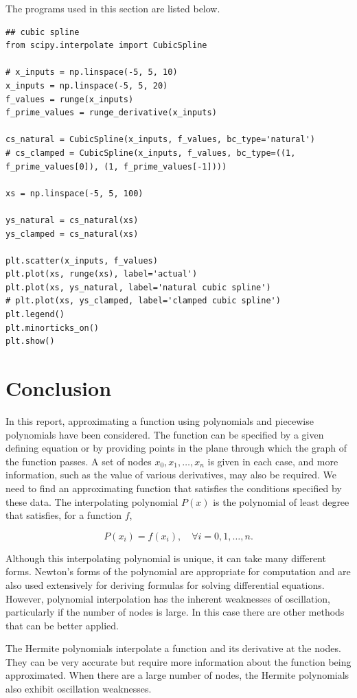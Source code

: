 \documentclass[preprint,12pt]{elsarticle}
\begin{document}
The programs used in this section are listed below.

\begin{lstlisting}
## cubic spline
from scipy.interpolate import CubicSpline

# x_inputs = np.linspace(-5, 5, 10)
x_inputs = np.linspace(-5, 5, 20)
f_values = runge(x_inputs)
f_prime_values = runge_derivative(x_inputs)

cs_natural = CubicSpline(x_inputs, f_values, bc_type='natural')
# cs_clamped = CubicSpline(x_inputs, f_values, bc_type=((1, f_prime_values[0]), (1, f_prime_values[-1])))

xs = np.linspace(-5, 5, 100)

ys_natural = cs_natural(xs)
ys_clamped = cs_natural(xs)

plt.scatter(x_inputs, f_values)
plt.plot(xs, runge(xs), label='actual')
plt.plot(xs, ys_natural, label='natural cubic spline')
# plt.plot(xs, ys_clamped, label='clamped cubic spline')
plt.legend()
plt.minorticks_on()
plt.show()
\end{lstlisting}

\section{Conclusion}
\label{S:5}

In this report, approximating a function using polynomials and piecewise polynomials have been considered. The function can be specified by a given defining equation or by providing points in the plane through which the graph of the function passes. A set of nodes $x_0,x_1,\dots,x_n$ is given in each case, and more information, such as the value of various derivatives, may also be required. We need to find an approximating function that satisfies the conditions specified by these data. The interpolating polynomial $P(x)$ is the polynomial of least degree that satisfies, for a function $f$,

$$P(x_i)=f(x_i),\quad\forall i=0,1,\dots,n.$$

Although this interpolating polynomial is unique, it can take many different forms. Newton’s forms of the polynomial are appropriate for computation and are also used extensively for deriving formulas for solving differential equations. However, polynomial interpolation has the inherent weaknesses of oscillation, particularly if the number of nodes is large. In this case there are other methods that can be better applied.

The Hermite polynomials interpolate a function and its derivative at the nodes. They can be very accurate but require more information about the function being approximated. When there are a large number of nodes, the Hermite polynomials also exhibit oscillation weaknesses.
\end{document}
